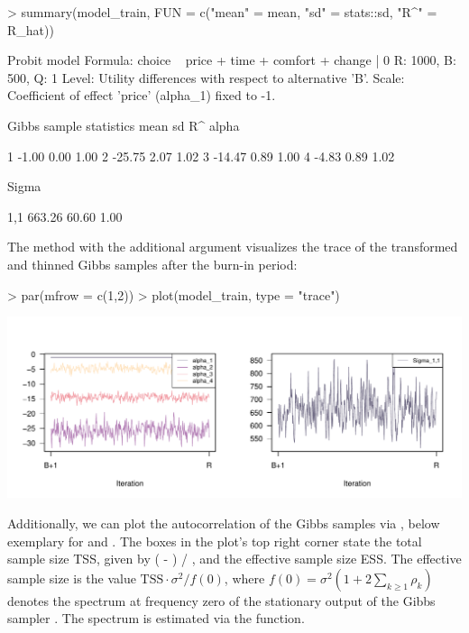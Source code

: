 \documentclass[article,shortnames]{jss}
\newcommand{\fct}[1]{\code{#1()}}
\begin{document}
\begin{Schunk}
\begin{Sinput}
> summary(model_train, FUN = c("mean" = mean, "sd" = stats::sd, "R^" = R_hat))
\end{Sinput}
\begin{Soutput}
Probit model
Formula: choice ~ price + time + comfort + change | 0 
R: 1000, B: 500, Q: 1
Level: Utility differences with respect to alternative 'B'.
Scale: Coefficient of effect 'price' (alpha_1) fixed to -1.

Gibbs sample statistics
          mean      sd      R^
 alpha
                              
     1   -1.00    0.00    1.00
     2  -25.75    2.07    1.02
     3  -14.47    0.89    1.00
     4   -4.83    0.89    1.02

 Sigma
                              
   1,1  663.26   60.60    1.00
\end{Soutput}
\end{Schunk}

The \fct{plot} method with the additional argument  visualizes the trace of the transformed and thinned Gibbs samples after the burn-in period:

\begin{Schunk}
\begin{Sinput}
> par(mfrow = c(1,2))
> plot(model_train, type = "trace")
\end{Sinput}
\end{Schunk}
\includegraphics{rprobitb_oelschlaeger_bauer-model-train-trace}

Additionally, we can plot the autocorrelation of the Gibbs samples via , below exemplary for  and . The boxes in the plot's top right corner state the total sample size TSS, given by ( - ) / , and the effective sample size ESS. The effective sample size is the value $\text{TSS} \cdot \sigma^2 / f(0)$, where $f(0) = \sigma^2(1 + 2\sum_{k\geq 1} \rho_k)$ denotes the spectrum at frequency zero of the stationary output of the Gibbs sampler \citep{Marin:2014}. The spectrum is estimated via the \fct{stats::spec.ar} function.
\end{document}
